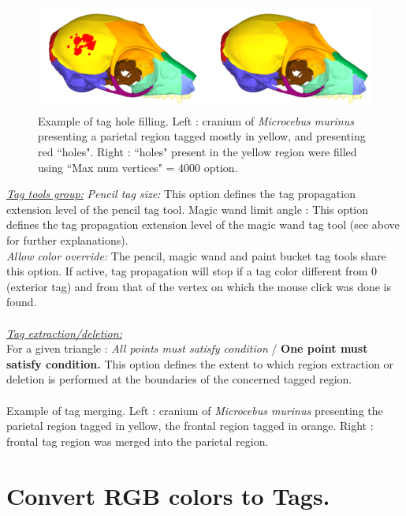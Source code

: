 \begin{figure}
  \centering
  \includegraphics[scale=0.25]{images/Tags/Fill_holes2.png} 
	\caption{Example of tag hole filling. Left : cranium of \textit{Microcebus murinus} presenting a parietal region tagged mostly in yellow, and presenting red ``holes". Right : ``holes" present in the yellow region were filled using ``Max num vertices" = 4000 option.
}
\label{tag_fill_holes_example}
 \end{figure}
\noindent
\textit{\underline{Tag tools group:}}
\textit{Pencil tag size:} This option defines the tag propagation extension
level of the pencil tag tool. Magic wand limit angle : This option defines the tag propagation extension level of the magic wand tag tool (see above for further explanations).\\
\textit{Allow color override:} The pencil, magic wand and paint bucket tag tools share this option. If active, tag propagation will stop if a tag color different from 0 (exterior tag) and from that of the vertex on which the mouse click was done is found.\\
\\
\noindent
\textit{\underline{Tag extraction/deletion:}}\\
For a given triangle : \textit{All points must satisfy condition} / \textbf{One point must satisfy condition.} This option defines the extent to which region extraction or deletion is performed at the boundaries of the concerned tagged region.\\\\
\noindent
Example of tag merging. Left : cranium of \textit{Microcebus murinus} presenting the parietal region
tagged in yellow, the frontal region tagged in orange. Right : frontal tag region was merged into the parietal region.


\section{Convert RGB colors to Tags.}

